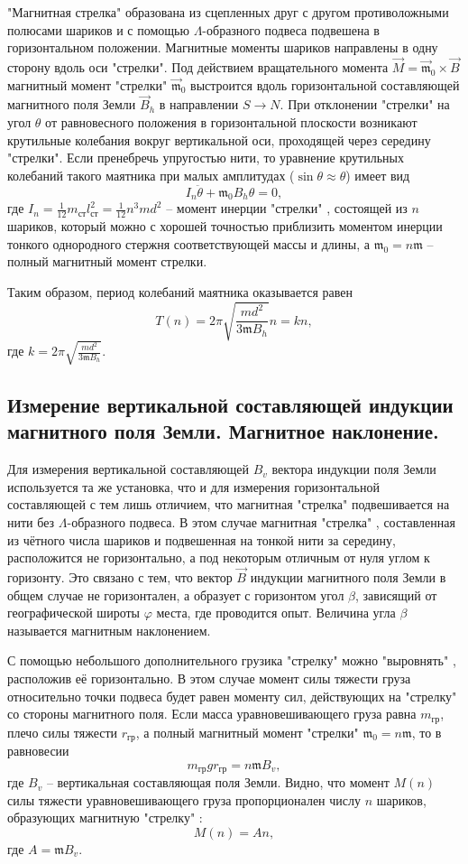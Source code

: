 \documentclass[a4paper,10pt]{article}
\begin{document}
"Магнитная стрелка" образована из сцепленных друг с другом противоложными полюсами шариков и с помощью $\Lambda$-образного подвеса подвешена в горизонтальном положении. Магнитные моменты шариков направлены в одну сторону вдоль оси "стрелки". Под действием вращательного момента $\vec{M}=\vec{\mathfrak{m}}_0\times\vec{B}$ магнитный момент "стрелки" $\vec{\mathfrak{m}}_0$ выстроится вдоль горизонтальной составляющей магнитного поля Земли $\vec{B}_h$ в направлении $S\to N$. При отклонении "стрелки" на угол $\theta$ от равновесного положения в горизонтальной плоскости возникают крутильные колебания вокруг вертикальной оси, проходящей через середину "стрелки". Если пренебречь упругостью нити, то уравнение крутильных колебаний такого маятника при малых амплитудах ($\sin{\theta}\approx\theta$) имеет вид\[I_n\ddot{\theta}+\mathfrak{m}_0B_h\theta=0,\]где $I_n=\frac{1}{12}m_{\text{ст}}l_{\text{ст}}^2=\frac{1}{12}n^3md^2$ -- момент инерции "стрелки" , состоящей из $n$ шариков, который можно с хорошей точностью приблизить моментом инерции тонкого однородного стержня соответствующей массы и длины, а $\mathfrak{m}_0=n\mathfrak{m}$ -- полный магнитный момент стрелки.

Таким образом, период колебаний маятника оказывается равен\[T(n)=2\pi\sqrt{\frac{md^2}{3\mathfrak{m}B_h}}n=kn,\]где $k=2\pi\sqrt{\frac{md^2}{3\mathfrak{m}B_h}}$.

\subsection*{Измерение вертикальной составляющей индукции магнитного поля Земли. Магнитное наклонение.}

Для измерения вертикальной составляющей $B_v$ вектора индукции поля Земли используется та же установка, что и для измерения горизонтальной составляющей с тем лишь отличием, что магнитная "стрелка" подвешивается на нити без $\Lambda$-образного подвеса. В этом случае магнитная "стрелка" , составленная из чётного числа шариков и подвешенная на тонкой нити за середину, расположится не горизонтально, а под некоторым отличным от нуля углом к горизонту. Это связано с тем, что вектор $\vec{B}$ индукции магнитного поля Земли в общем случае не горизонтален, а образует с горизонтом угол $\beta$, зависящий от географической широты $\varphi$ места, где проводится опыт. Величина угла $\beta$ называется магнитным наклонением.

С помощью небольшого дополнительного грузика "стрелку" можно "выровнять" , расположив её горизонтально. В этом случае момент силы тяжести груза относительно точки подвеса будет равен моменту сил, действующих на "стрелку" со стороны магнитного поля. Если масса уравновешивающего груза равна $m_{\text{гр}}$, плечо силы тяжести $r_{\text{гр}}$, а полный магнитный момент "стрелки" $\mathfrak{m}_0=n\mathfrak{m}$, то в равновесии\[m_{\text{гр}}gr_{\text{гр}}=n\mathfrak{m}B_v,\]где $B_v$ -- вертикальная составляющая поля Земли. Видно, что момент $M(n)$ силы тяжести уравновешивающего груза пропорционален числу $n$ шариков, образующих магнитную "стрелку" :\[M(n)=An,\]где $A=\mathfrak{m}B_v$.
\end{document}
